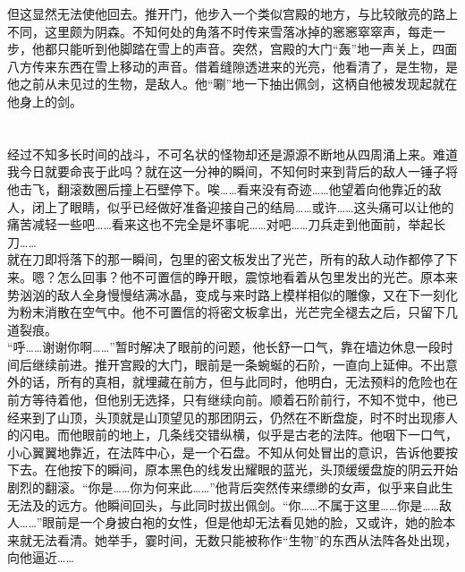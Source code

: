 \documentclass[a4paper]{article}
\begin{document}
		\indent 但这显然无法使他回去。推开门，他步入一个类似宫殿的地方，与比较敞亮的路上不同，这里颇为阴森。不知何处的角落不时传来雪落冰掉的窸窸窣窣声，每走一步，他都只能听到他脚踏在雪上的声音。突然，宫殿的大门“轰”地一声关上，四面八方传来东西在雪上移动的声音。借着缝隙透进来的光亮，他看清了，是生物，是他之前从未见过的生物，是敌人。他“唰”地一下抽出佩剑，这柄自他被发现起就在他身上的剑。
	\section{}
		经过不知多长时间的战斗，不可名状的怪物却还是源源不断地从四周涌上来。难道我今日就要命丧于此吗？就在这一分神的瞬间，不知何时来到背后的敌人一锤子将他击飞，翻滚数圈后撞上石壁停下。唉……看来没有奇迹……他望着向他靠近的敌人，闭上了眼睛，似乎已经做好准备迎接自己的结局……或许……这头痛可以让他的痛苦减轻一些吧……看来这也不完全是坏事呢……对吧……刀兵走到他面前，举起长刀……\\
		\indent 就在刀即将落下的那一瞬间，包里的密文板发出了光芒，所有的敌人动作都停了下来。嗯？怎么回事？他不可置信的睁开眼，震惊地看着从包里发出的光芒。原本来势汹汹的敌人全身慢慢结满冰晶，变成与来时路上模样相似的雕像，又在下一刻化为粉末消散在空气中。他不可置信的将密文板拿出，光芒完全褪去之后，只留下几道裂痕。\\
		\indent “呼……谢谢你啊……”暂时解决了眼前的问题，他长舒一口气，靠在墙边休息一段时间后继续前进。推开宫殿的大门，眼前是一条蜿蜒的石阶，一直向上延伸。不出意外的话，所有的真相，就埋藏在前方，但与此同时，他明白，无法预料的危险也在前方等待着他，但他别无选择，只有继续向前。顺着石阶前行，不知不觉中，他已经来到了山顶，头顶就是山顶望见的那团阴云，仍然在不断盘旋，时不时出现瘆人的闪电。而他眼前的地上，几条线交错纵横，似乎是古老的法阵。他咽下一口气，小心翼翼地靠近，在法阵中心，是一个石盘。不知从何处冒出的意识，告诉他要按下去。在他按下的瞬间，原本黑色的线发出耀眼的蓝光，头顶缓缓盘旋的阴云开始剧烈的翻滚。“你是……你为何来此……”他背后突然传来缥缈的女声，似乎来自此生无法及的远方。他瞬间回头，与此同时拔出佩剑。“你……不属于这里……你是……敌人……”眼前是一个身披白袍的女性，但是他却无法看见她的脸，又或许，她的脸本来就无法看清。她举手，霎时间，无数只能被称作“生物”的东西从法阵各处出现，向他逼近……
\end{document}
